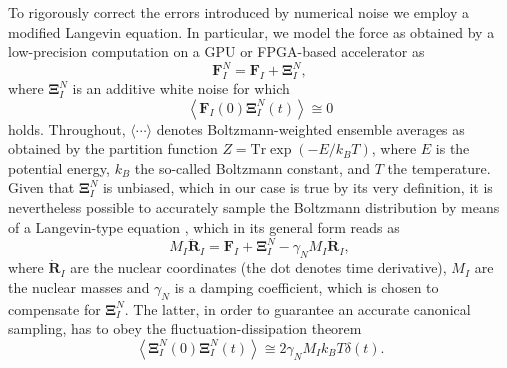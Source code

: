 \documentclass[format=acmsmall,urlbreakonhyphens]{acmart}
\begin{document}
To rigorously correct the errors introduced by numerical noise we employ a modified Langevin equation. In particular, we model the force as obtained by a low-precision computation on a GPU or FPGA-based accelerator as
\begin{equation} \label{fFPGA}
\textbf{F}_{I}^{N} = \textbf{F}_{I} + \mathbf{\Xi }_{I}^{N},
\end{equation}
where $\mathbf{\Xi }_{I}^{N}$ is an additive white noise for which
\begin{equation} \label{CrossCorr}
 \left \langle \textbf{F}_{I}\left ( 0 \right ) \mathbf{\Xi } _{I}^{N}\left ( t \right )\right \rangle \cong  0
\end{equation}
holds. Throughout, $\langle \cdots \rangle$ denotes Boltzmann-weighted ensemble averages as obtained by the partition function $Z=\text{Tr} \exp(-E/k_B T)$, where $E$ is the potential energy, $k_B$ the so-called Boltzmann constant, and $T$ the temperature. Given that $\mathbf{\Xi }_{I}^{N}$ is unbiased, which in our case is true by its very definition, it is nevertheless possible to accurately sample the Boltzmann distribution by means of a Langevin-type equation \cite{Krajewski,Richters,Karhan}, which in its general form reads as
\begin{equation} \label{LangevinEq}
M_{I}\ddot{\textbf{R}}_{I}=\textbf{F}_{I}+\mathbf{\Xi }_{I}^{N}-\gamma _{N}M_{I}\dot{\textbf{R}}_{I},
\end{equation}
where $\dot{\textbf{R}}_{I}$ are the nuclear coordinates (the dot denotes time derivative), $M_I$ are the nuclear masses and $\gamma _{N}$ is a damping coefficient,
which is chosen to compensate for \(\mathbf{\Xi }_{I}^{N}\). The latter, in order to guarantee an accurate canonical sampling, has to obey
the fluctuation-dissipation theorem
\begin{equation}
\left \langle \mathbf{\Xi }_{I}^{N}\left ( 0 \right ) \mathbf{\Xi }_{I}^{N}\left ( t \right ) \right \rangle \cong  2 \gamma_{N} M_I k_{B} T  \delta \left ( t \right ).
\label{FDT}
\end{equation}
\end{document}

